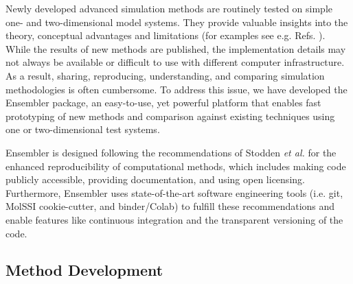 Newly developed advanced simulation methods are routinely tested on simple one- and two-dimensional model systems. They provide valuable insights into the theory, conceptual advantages and limitations (for examples see e.g. Refs. \cite{Huber1994, Laio2002, Christ2007, Konig2012, Koenig2020, Donnini2016, Weiss2016, Lemke2018}).
While the results of new methods are published, the implementation details may not always be available or difficult to use with different computer infrastructure.
As a result, sharing, reproducing, understanding, and comparing simulation methodologies is often cumbersome.\cite{Peng2011}
To address this issue, we have developed the Ensembler package, an easy-to-use, yet powerful platform that enables fast prototyping of new methods and comparison against existing techniques using one or two-dimensional test systems.

Ensembler is designed following the recommendations of Stodden \textit{et al.}\cite{Stodden2016} for the enhanced reproducibility of computational methods, which includes making code publicly accessible, providing documentation, and using open licensing.\cite{Stodden2016} 
Furthermore, Ensembler uses state-of-the-art software engineering tools (i.e. git,\cite{Chacon2014} MolSSI cookie-cutter,\cite{Naden2018} and binder\cite{Binder2018}/Colab\cite{Bisong2019}) to fulfill these recommendations and enable features like continuous integration and the transparent versioning of the code. 

\subsection{Method Development}

